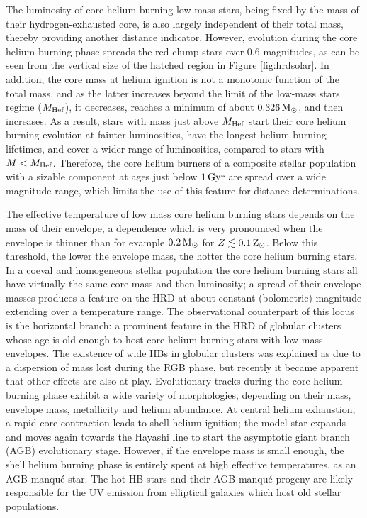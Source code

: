 \documentclass[a4paper,10pt]{article}
\begin{document}
{\noindent}The luminosity of core helium burning low-mass stars, being fixed by the mass of their hydrogen-exhausted core, is also largely independent of their total mass, thereby providing another distance indicator. However, evolution during the core helium burning phase spreads the red clump stars over $0.6$ magnitudes, as can be seen from the vertical size of the hatched region in Figure \ref{fig:hrdsolar}. In addition, the core mass at helium ignition is not a monotonic function of the total mass, and as the latter increases beyond the limit of the low-mass stars regime ($M_{\rm Hef}$), it decreases, reaches a minimum of about $0.326\,{\rm M_\odot}$, and then increases. As a result, stars with mass just above $M_{\rm Hef}$ start their core helium burning evolution at fainter luminosities, have the longest helium burning lifetimes, and cover a wider range of luminosities, compared to stars with $M<M_{\rm Hef}$. Therefore, the core helium burners of a composite stellar population with a sizable component at ages just below $1\,{\rm Gyr}$ are spread over a wide magnitude range, which limits the use of this feature for distance determinations.

{\noindent}The effective temperature of low mass core helium burning stars depends on the mass of their envelope, a dependence which is very pronounced when the envelope is thinner than for example $0.2\,{\rm M_\odot}$ for $Z\lesssim0.1\,{\rm Z_\odot}$. Below this threshold, the lower the envelope mass, the hotter the core helium burning stars. In a coeval and homogeneous stellar population the core helium burning stars all have virtually the same core mass and then luminosity; a spread of their envelope masses produces a feature on the HRD at about constant (bolometric) magnitude extending over a temperature range. The observational counterpart of this locus is the horizontal branch: a prominent feature in the HRD of globular clusters whose age is old enough to host core helium burning stars with low-mass envelopes. The existence of wide HBs in globular clusters was explained as due to a dispersion of mass lost during the RGB phase, but recently it became apparent that other effects are also at play. Evolutionary tracks during the core helium burning phase exhibit a wide variety of morphologies, depending on their mass, envelope mass, metallicity and helium abundance. At central helium exhaustion, a rapid core contraction leads to shell helium ignition; the model star expands and moves again towards the Hayashi line to start the asymptotic giant branch (AGB) evolutionary stage. However, if the envelope mass is small enough, the shell helium burning phase is entirely spent at high effective temperatures, as an AGB manqu\'e star. The hot HB stars and their AGB manqu\'e progeny are likely responsible for the UV emission from elliptical galaxies which host old stellar populations.
\end{document}
